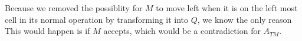\documentclass{article}
\begin{document}
\begin{enumerate}
\begin{enumerate}
                    Because we removed the possiblity for $M$ to move left when it is on the left most cell in its normal operation by transforming it into $Q$, we know the only reason This would happen is if $M$ accepts, which would be a contradiction for $A_{TM}$.

    \end{enumerate}
 \end{enumerate}
\end{document}
